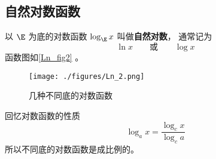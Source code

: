 
\begin{issues}
\issueDraft
\end{issues}

\subsection{自然对数函数}
以 $\E$ 为底的对数函数 $\log_{\E} x$ 叫做\textbf{自然对数}， 通常记为
\begin{equation}
\ln x \qquad \text{或} \qquad \log x
\end{equation}
函数图如\autoref{Ln_fig2} 。
\begin{figure}[ht]
\centering
\texttt{[image: ./figures/Ln\_2.png]}
\caption{几种不同底的对数函数} \label{Ln_fig2}
\end{figure}
回忆对数函数的性质
\begin{equation}
\log_a x = \frac{\log_c x}{\log_c a}
\end{equation}
所以不同底的对数函数是成比例的。